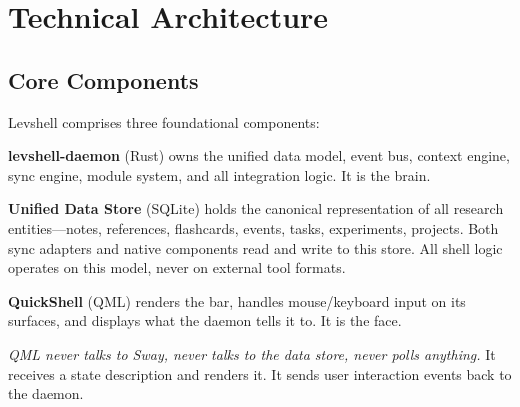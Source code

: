 \documentclass[11pt,a4paper]{article}
\begin{document}
\newpage
\section{Technical Architecture}
\label{sec:architecture}

\subsection{Core Components}

Levshell comprises three foundational components:

\begin{designbox}
\textbf{levshell-daemon} (Rust) owns the unified data model, event bus, context engine, sync engine, module system, and all integration logic. It is the brain.

\textbf{Unified Data Store} (SQLite) holds the canonical representation of all research entities---notes, references, flashcards, events, tasks, experiments, projects. Both sync adapters and native components read and write to this store. All shell logic operates on this model, never on external tool formats.

\textbf{QuickShell} (QML) renders the bar, handles mouse/keyboard input on its surfaces, and displays what the daemon tells it to. It is the face.

\textit{QML never talks to Sway, never talks to the data store, never polls anything.} It receives a state description and renders it. It sends user interaction events back to the daemon.
\end{designbox}
\end{document}
